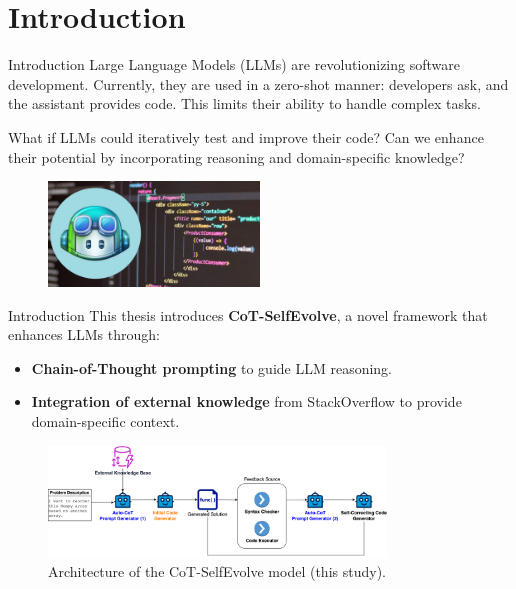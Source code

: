\section{Introduction}

\begin{frame}{Introduction}
    Large Language Models (LLMs) are revolutionizing software development. Currently, they are used in a zero-shot manner: developers ask, and the assistant provides code. This limits their ability to handle complex tasks.

    \vspace{0.5cm}

    What if LLMs could iteratively test and improve their code? Can we enhance their potential by incorporating reasoning and domain-specific knowledge?

    \begin{figure}[!htb]
        \centering
        \includegraphics[width=0.5\textwidth]{img/llm_for_coding}
    \end{figure}
\end{frame}

\begin{frame}{Introduction}
    This thesis introduces \textbf{CoT-SelfEvolve}, a novel framework that enhances LLMs through:

    \begin{itemize}
        \item \textbf{Chain-of-Thought prompting} to guide LLM reasoning.
        \item \textbf{Integration of external knowledge} from StackOverflow to provide domain-specific context.
    \end{itemize}

    \begin{figure}[!htb]
        \centering
        \includegraphics[width=0.8\textwidth]{img/cot_selfevolve_architecture}
        \captionsetup{font=small,labelformat=empty}
        \caption{Architecture of the CoT-SelfEvolve model (this study).}
    \end{figure}
\end{frame}
